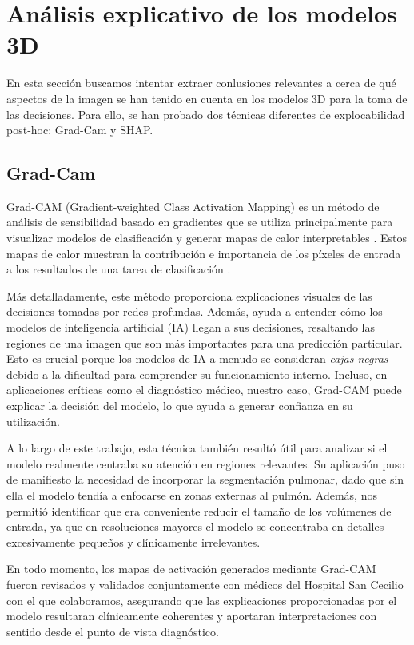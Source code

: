 \section{Análisis explicativo de los modelos 3D}
En esta sección buscamos intentar extraer conlusiones relevantes a cerca de qué aspectos de la imagen se han tenido en cuenta en los modelos 3D para la toma de las decisiones. Para ello, se han probado dos técnicas diferentes de explocabilidad post-hoc: Grad-Cam y SHAP. 

\subsection{Grad-Cam}
Grad-CAM (Gradient-weighted Class Activation Mapping) es un método de análisis de sensibilidad basado en gradientes que se utiliza principalmente para visualizar modelos de clasificación y generar mapas de calor interpretables \parencite{wang2023grad}.
Estos mapas de calor muestran la contribución e importancia de los píxeles de entrada a los resultados de una tarea de clasificación \parencite{xiao2021visualization}.

Más detalladamente, este método proporciona explicaciones visuales de las decisiones tomadas por redes profundas. Además, ayuda a entender cómo los modelos de inteligencia artificial (IA) llegan a sus decisiones, resaltando las regiones de una imagen que son más importantes para una predicción particular. Esto es crucial porque los modelos de IA a menudo se consideran \textit{cajas negras} debido a la dificultad para comprender su funcionamiento interno. Incluso, en aplicaciones críticas como el diagnóstico médico, nuestro caso, Grad-CAM puede explicar la decisión del modelo, lo que ayuda a generar confianza en su utilización. 

A lo largo de este trabajo, esta técnica también resultó útil para analizar si el modelo realmente centraba su atención en regiones relevantes. Su aplicación puso de manifiesto la necesidad de incorporar la segmentación pulmonar, dado que sin ella el modelo tendía a enfocarse en zonas externas al pulmón. Además, nos permitió identificar que era conveniente reducir el tamaño de los volúmenes de entrada, ya que en resoluciones mayores el modelo se concentraba en detalles excesivamente pequeños y clínicamente irrelevantes.

En todo momento, los mapas de activación generados mediante Grad-CAM fueron revisados y validados conjuntamente con médicos del Hospital San Cecilio con el que colaboramos, asegurando que las explicaciones proporcionadas por el modelo resultaran clínicamente coherentes y aportaran interpretaciones con sentido desde el punto de vista diagnóstico.

